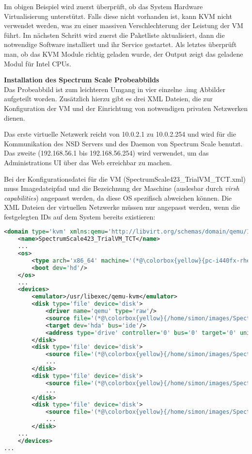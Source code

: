 Im obigen Beispiel wird zuerst überprüft, ob das System Hardware Virtualisierung unterstützt. Falls diese nicht vorhanden ist, kann KVM nicht verwendet werden, was zu einer massiven Verschlechterung der Leistung der VM führt.
Im nächsten Schritt wird zuerst die Paketliste aktualisiert, dann die notwendige Software installiert und ihr Service gestartet. Als letztes überprüft man, ob das KVM Module richtig geladen wurde, der Output zeigt das geladene Modul für Intel CPUs.

\textbf{Installation des Spectrum Scale Probeabbilds}\\
Das Probeabbild ist zum leichteren Umgang in vier einzelne .img Abbilder aufgeteilt worden. Zusätzlich hierzu gibt es drei XML Dateien, die zur Konfiguration der VM und der Einrichtung von notwendigen privaten Netzwerken dienen.

Das erste virtuelle Netzwerk reicht von 10.0.2.1 zu 10.0.2.254 und wird für die Kommunikation des \acs{NSD} Servers und des Daemon von Spectrum Scale benutzt. Das zweite (192.168.56.1 bis 192.168.56.254) wird verwendet, um das Administrations UI über das Web erreichbar zu machen.

Bei der Konfigurationsdatei für die VM (SpectrumScale423\_TrialVM\_TCT.xml) muss Imagedateipfad und die Bezeichnung der Maschine (auslesbar durch \textit{virsh capabilities}) angepasst werden, da diese OS spezifisch abweichen können. Die XML Dateien der virtuellen Netzwerke müssen nur angepasst werden, wenn die festgelegten IDs auf dem System bereits existieren: \\

\begin{lstlisting}[language=xml, caption=Veränderung der relevanten XML Konfiguration]
<domain type='kvm' xmlns:qemu='http://libvirt.org/schemas/domain/qemu/1.0'>
	<name>SpectrumScale423_TrialVM_TCT</name>
	...
	<os>
		<type arch='x86_64' machine='(*@\colorbox{yellow}{pc-i440fx-rhel7.0.0}@*)'>hvm</type> 
		<boot dev='hd'/>
	</os>
	...
	<devices>
		<emulator>/usr/libexec/qemu-kvm</emulator>
		<disk type='file' device='disk'>
			<driver name='qemu' type='raw'/>
			<source file='(*@\colorbox{yellow}{/home/simon/images/SpectrumScale421\_TrialVM-disk1.img}@*)'/>
			<target dev='hda' bus='ide'/>
			<address type='drive' controller='0' bus='0' target='0' unit='0'/>
		</disk>
		<disk type='file' device='disk'>
			<source file='(*@\colorbox{yellow}{/home/simon/images/SpectrumScale421\_TrialVM-disk2.img}@*)'/>
			...
		</disk>
		<disk type='file' device='disk'>
			<source file='(*@\colorbox{yellow}{/home/simon/images/SpectrumScale421\_TrialVM-disk3.img}@*)'/>
			...
		</disk>
		<disk type='file' device='disk'>
			<source file='(*@\colorbox{yellow}{/home/simon/images/SpectrumScale421\_TrialVM-disk4.img}@*)'/>
			...
		</disk>
	...
	</devices>
...
\end{lstlisting}

